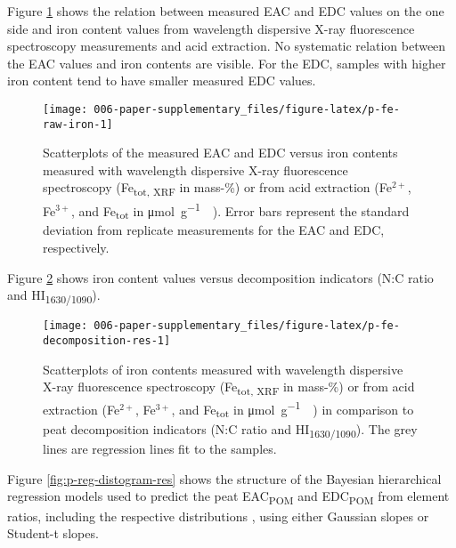 \documentclass[draft,linenumbers]{agujournal2018}
\begin{document}
\clearpage

Figure \ref{fig:p-fe-raw-iron} shows the relation between measured EAC
and EDC values on the one side and iron content values from wavelength
dispersive X-ray fluorescence spectroscopy measurements and acid
extraction. No systematic relation between the EAC values and iron
contents are visible. For the EDC, samples with higher iron content tend
to have smaller measured EDC values.

\begin{figure}[H]

{\centering \texttt{[image: 006-paper-supplementary\_files/figure-latex/p-fe-raw-iron-1]} 

}

\caption{Scatterplots of the measured EAC and EDC versus iron contents measured with wavelength dispersive X-ray fluorescence spectroscopy (Fe\textsubscript{tot, XRF} in mass-\%) or from acid extraction (Fe$^{2+}$, Fe$^{3+}$, and Fe\textsubscript{tot} in \si{\micro\mol\per\gram\of\sample}). Error bars represent the standard deviation from replicate measurements for the EAC and EDC, respectively.}\label{fig:p-fe-raw-iron}
\end{figure}

\clearpage

Figure \ref{fig:p-fe-decomposition-res} shows iron content values versus
decomposition indicators (N:C ratio and HI\textsubscript{1630/1090}).

\begin{figure}[H]

{\centering \texttt{[image: 006-paper-supplementary\_files/figure-latex/p-fe-decomposition-res-1]} 

}

\caption{Scatterplots of iron contents measured with wavelength dispersive X-ray fluorescence spectroscopy (Fe\textsubscript{tot, XRF} in mass-\%) or from acid extraction (Fe$^{2+}$, Fe$^{3+}$, and Fe\textsubscript{tot} in \si{\micro\mol\per\gram\of\sample}) in comparison to peat decomposition indicators (N:C ratio and HI\textsubscript{1630/1090}). The grey lines are regression lines fit to the samples.}\label{fig:p-fe-decomposition-res}
\end{figure}

\clearpage

Figure \ref{fig:p-reg-distogram-res} shows the structure of the Bayesian
hierarchical regression models used to predict the peat
EAC\textsubscript{POM} and EDC\textsubscript{POM} from element ratios,
including the respective distributions
\citep{Kruschke.2015, Baath.2018}, using either Gaussian slopes or
Student-t slopes.
\end{document}
